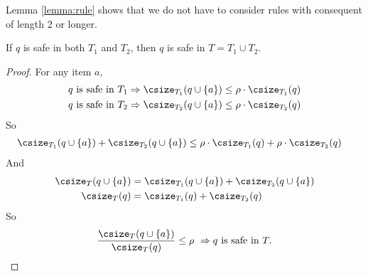 Lemma \ref{lemma:rule} shows that we do not have to consider rules with consequent of length 2 or longer.

\begin{lemma}%
\label{CorrectnessOfPartitioning}
  If $q$ is safe in both $T_1$ and $T_2$, then $q$ is safe in $T = T_1 \cup T_2$.
\end{lemma}
\begin{proof}
For any item $a$,
  \begin{align*}
   q~\text{is safe in}~T_1 &\Rightarrow \csize_{T_1}(q\cup\{a\}) \le \rho\cdot\csize_{T_1}(q) \\
   q~\text{is safe in}~T_2 &\Rightarrow \csize_{T_2}(q\cup\{a\}) \le \rho\cdot\csize_{T_2}(q)
  \end{align*}
  So \begin{align*}
   \csize_{T_1}(q\cup\{a\}) + \csize_{T_2}(q\cup\{a\}) &\le \rho\cdot\csize_{T_1}(q) + \rho\cdot\csize_{T_2}(q)
  \end{align*}
  And \begin{align*}
    \csize_T(q\cup\{a\}) &= \csize_{T_1}(q\cup\{a\}) + \csize_{T_2}(q\cup\{a\}) \\
    \csize_T(q) &= \csize_{T_1}(q) + \csize_{T_2}(q)
  \end{align*}
  So $$ \frac{\csize_T(q\cup\{a\})}{\csize_T(q)} \le \rho~\Rightarrow q~\text{is safe in}~T .$$
\end{proof}


